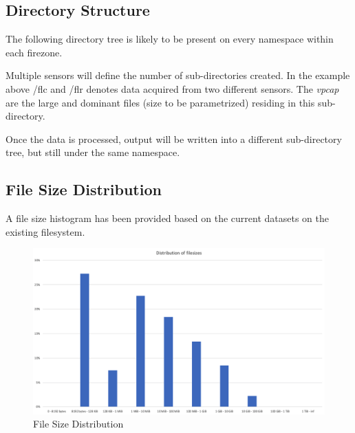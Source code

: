 \documentclass{article}
\begin{document}
\subsection{Directory Structure}
The following directory tree is likely to be present on every namespace within each firezone.

\vspace{5mm}

Multiple sensors will define the number of sub-directories created. In the example above /flc and /flr denotes data acquired from two different sensors. The \textit{vpcap} are the large and dominant files (size to be parametrized) residing in this sub-directory.

Once the data is processed, output will be written into a different sub-directory tree, but still under the same namespace. 

\vspace{5mm}

\subsection{File Size Distribution}
A file size histogram has been provided based on the current datasets on the existing filesystem. 

\begin{figure}
    \centering
    \includegraphics[scale=0.52]{zen_histogram.png}
    \caption{File Size Distribution}
    \label{fig:zen_histogram}
\end{figure}
\end{document}
